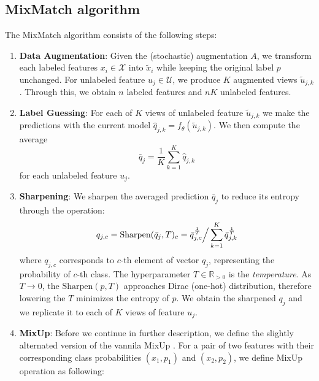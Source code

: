 \subsection{MixMatch algorithm}
The MixMatch algorithm consists of the following steps:
\begin{enumerate}
    \item \textbf{Data Augmentation}\label{data-augmentation}: Given the (stochastic) augmentation $A$, we transform each labeled features $x_i \in \mathcal{X}$ into $\tilde{x}_i$ while keeping the 
        original label $p$ unchanged. For unlabeled feature $u_j \in \mathcal{U}$, we produce $K$ augmented views $\tilde{u}_{j,k}$. Through this, we obtain $n$ labeled features and
        $nK$ unlabeled features. 
    \item \textbf{Label Guessing}\label{label-guessing}: For each of $K$ views of unlabeled feature $\tilde{u}_{j,k}$ we make the predictions with the current model 
        $\hat{q}_{j,k} = f_\theta(\tilde{u}_{j,k})$. We then compute the average
            \begin{equation*}
                \bar{q}_{j} = \frac{1}{K}\sum_{k=1}^K \hat{q}_{j,k}
            \end{equation*}
        for each unlabeled feature $u_j$.
    \item \textbf{Sharpening}\label{sharpening}: We sharpen the averaged prediction $\bar{q}_{j}$ to reduce its entropy through the operation:
            \begin{equation*}
                q_{j,c} = \text{Sharpen}(\bar{q}_{j},T)_c = \bar{q}_{j,c}^{\frac{1}{T}} \Big{/} \sum_{k=1}^{K} \bar{q}_{j,k}^{\frac{1}{T}} 
            \end{equation*}
        where $q_{j,c}$ corresponds to $c$-th element of vector $q_{j}$, representing the probability of $c$-th class. 
        The hyperparameter $T \in \mathbb{R}_{>0}$ is the \textit{temperature}. As $T\to 0$, the $\text{Sharpen}(p,T)$ approaches Dirac (one-hot) distribution, 
        therefore lowering the $T$ minimizes the entropy of $p$. We obtain the sharpened $q_{j}$ and we replicate it to each of $K$ views of feature $u_{j}$.
    \item \textbf{MixUp}: Before we continue in further description, we define the slightly alternated version of the vannila MixUp \cite{mixup-2018}.
            For a pair of two features with their corresponding class probabilities $(x_1,p_1)$ and $(x_2,p_2)$, we define MixUp operation as following:
            \begin{align*}

\end{align*}
\end{enumerate}
